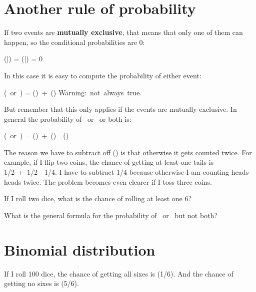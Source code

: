 \documentclass[12pt]{book}
\begin{document}
\section{Another rule of probability}

\newcommand{\OR}{~\mbox{or}~}
\newcommand{\NOT}{~\mbox{not}~}

If two events are {\bf mutually exclusive}, that means that only
one of them can happen, so the conditional probabilities are 0:

\quad \Prob(\A|\B) = \Prob(\B|\A) = 0

In this case it is easy to compute the probability of either event:

\quad \Prob(\A \OR \B) = \Prob(\A)~+~\Prob(\B)   \quad \mbox{Warning: not always true.}

But remember that this only applies if the events are mutually
exclusive.  In general the probability of \A~or \B~or both is:

\quad \Prob(\A \OR \B) = \Prob(\A)~+~\Prob(\B)~\minus~\Prob(\A \AND \B)

The reason we have to subtract off \Prob(\A \AND \B) is that otherwise it
gets counted twice.  For example, if I flip two coins, the chance of
getting at least one tails is 1/2~+~1/2~\minus~1/4.  I have to subtract
1/4 because otherwise I am counting heads-heads twice.  The problem
becomes even clearer if I toss three coins.

\begin{exercise}
If I roll two dice, what is the chance of rolling at least one 6?


\end{exercise}

\begin{exercise}
What is the general formula for the probability of \A~or \B~but not both?


\end{exercise}


\section{Binomial distribution}

If I roll 100 dice, the chance of getting all sixes is
(1/6).  And the chance of getting no sixes is (5/6).
\end{document}
